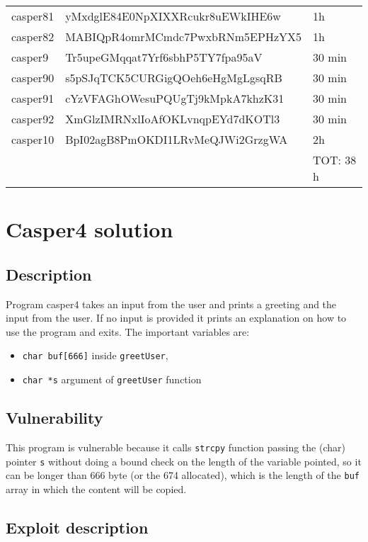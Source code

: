 \documentclass[a4paper,12pt]{article}
\begin{document}
\begin{table}[H]
\begin{tabularx}{\linewidth} {l|l|l}
 casper81 & yMxdglE84E0NpXIXXRcukr8uEWkIHE6w &  1h\\ 
 casper82 & MABIQpR4omrMCmdc7PwxbRNm5EPHzYX5 & 1h \\ 
 \hline
 casper9 & Tr5upeGMqqat7Yrf6sbhP5TY7fpa95aV & 30 min  \\
 casper90 &  s5pSJqTCK5CURGigQOeh6eHgMgLgsqRB & 30 min \\
 casper91 &  cYzVFAGhOWesuPQUgTj9kMpkA7khzK31 & 30 min \\
 casper92 & XmGlzIMRNxlIoAfOKLvnqpEYd7dKOTl3 & 30 min\\
 \hline
	casper10 & BpI02agB8PmOKDI1LRvMeQJWi2GrzgWA & 2h \\
	\hline \hline
  	& & TOT: 38 h
\end{tabularx}
\end{table}

\newpage
\section{Casper4 solution}
\subsection{Description}
Program casper4 takes an input from the user and prints a greeting and the input from the user. If no input is provided it prints an explanation on how to use the program and exits. The important variables are:
\begin{itemize}
\item \texttt{char buf[666]} inside \texttt{greetUser},
\item \texttt{char *s} argument of \texttt{greetUser} function
\end{itemize}
 

\subsection{Vulnerability}

This program is vulnerable because it calls \texttt{strcpy} function passing the (char) pointer \texttt{s} without doing a bound check on the length of the variable pointed, so it can be longer than 666 byte (or the 674 allocated), which is the length of the \texttt{buf} array in which the content will be copied.

\subsection{Exploit description}
\end{document}

